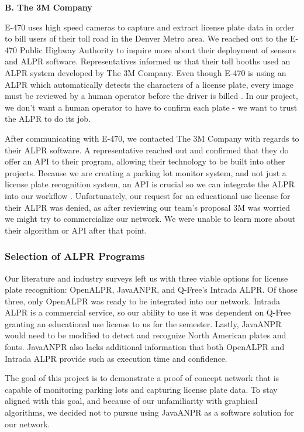 \documentclass[11pt, oneside, fullpage, doublespace]{article}
\begin{document}
\textbf{B. The 3M Company}

E-470 uses high speed cameras to capture and extract license plate data in order to bill users of their toll road in the Denver Metro area. We reached out to the E-470 Public Highway Authority to inquire more about their deployment of sensors and ALPR software. Representatives informed us that their toll booths used an ALPR system developed by The 3M Company. Even though E-470 is using an ALPR which automatically detects the characters of a license plate, every image must be reviewed by a human operator before the driver is billed \cite{e470}. In our project, we don't want a human operator to have to confirm each plate - we want to trust the ALPR to do its job.

After communicating with E-470, we contacted The 3M Company with regards to their ALPR software. A representative reached out and confirmed that they do offer an API to their program, allowing their technology to be built into other projects. Because we are creating a parking lot monitor system, and not just a license plate recognition system, an API is crucial so we can integrate the ALPR into our workflow \cite{mmmalpr}. Unfortunately, our request for an educational use license for their ALPR was denied, as after reviewing our team's proposal 3M was worried we might try to commercialize our network. We were unable to learn more about their algorithm or API after that point.

\subsubsection{Selection of ALPR Programs}
Our literature and industry surveys left us with three viable options for license plate recognition: OpenALPR, JavaANPR, and Q-Free's Intrada ALPR. Of those three, only OpenALPR was ready to be integrated into our network. Intrada ALPR is a commercial service, so our ability to use it was dependent on Q-Free granting an educational use license to us for the semester. Lastly, JavaANPR would need to be modified to detect and recognize North American plates and fonts. JavaANPR also lacks additional information that both OpenALPR and Intrada ALPR provide such as execution time and confidence.

The goal of this project is to demonstrate a proof of concept network that is capable of monitoring parking lots and capturing license plate data. To stay aligned with this goal, and because of our unfamiliarity with graphical algorithms, we decided not to pursue using JavaANPR as a software solution for our network.
\end{document}
